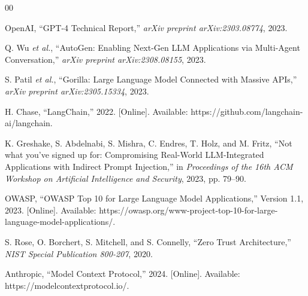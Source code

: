 \documentclass[conference]{IEEEtran}
\begin{document}
\begin{thebibliography}{00}

 OpenAI, ``GPT-4 Technical Report,'' \textit{arXiv preprint arXiv:2303.08774}, 2023.

 Q. Wu \textit{et al.}, ``AutoGen: Enabling Next-Gen LLM Applications via Multi-Agent Conversation,'' \textit{arXiv preprint arXiv:2308.08155}, 2023.

 S. Patil \textit{et al.}, ``Gorilla: Large Language Model Connected with Massive APIs,'' \textit{arXiv preprint arXiv:2305.15334}, 2023.

 H. Chase, ``LangChain,'' 2022. [Online]. Available: https://github.com/langchain-ai/langchain.

 K. Greshake, S. Abdelnabi, S. Mishra, C. Endres, T. Holz, and M. Fritz, ``Not what you've signed up for: Compromising Real-World LLM-Integrated Applications with Indirect Prompt Injection,'' in \textit{Proceedings of the 16th ACM Workshop on Artificial Intelligence and Security}, 2023, pp. 79--90.

 OWASP, ``OWASP Top 10 for Large Language Model Applications,'' Version 1.1, 2023. [Online]. Available: https://owasp.org/www-project-top-10-for-large-language-model-applications/.

 S. Rose, O. Borchert, S. Mitchell, and S. Connelly, ``Zero Trust Architecture,'' \textit{NIST Special Publication 800-207}, 2020.

 Anthropic, ``Model Context Protocol,'' 2024. [Online]. Available: https://modelcontextprotocol.io/.

\end{thebibliography}
\end{document}
